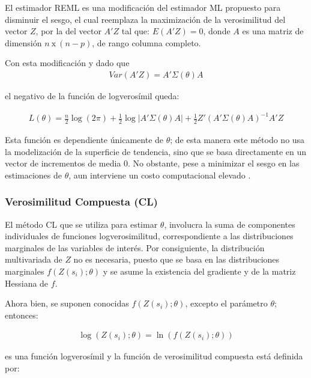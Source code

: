 \documentclass[
]{book}
\begin{document}
El estimador REML es una modificación del estimador ML propuesto para disminuir el sesgo, el cual reemplaza la maximización de la verosimilitud del vector \(Z\), por la del vector \(A'Z\) tal que: \(E(A'Z)=0\), donde \(A\) es una matriz de dimensión \(n\ \text{x}\ (n-p)\), de rango columna completo.

Con esta modificación y dado que \begin{align}
  Var(A'Z)=A'\Sigma(\theta)A  
\end{align}

el negativo de la función de logverosímil queda:

\begin{align}
   L(\theta)=\frac{n}{2}\log(2\pi)+\frac{1}{2} \log|A'\Sigma(\theta) A|+\frac{1}{2}Z'(A'\Sigma(\theta) A)^{-1} A'Z 
\end{align}

Esta función es dependiente únicamente de \(\theta\); de esta manera este método no usa la modelización de la superficie de tendencia, sino que se basa directamente en un vector de incrementos de media 0. No obstante, pese a minimizar el sesgo en las estimaciones de \(\theta\), aun interviene un costo computacional elevado \citep{marta}.

\hypertarget{verosimilitud-compuesta-cl}{%
\subsubsection*{Verosimilitud Compuesta (CL)}\label{verosimilitud-compuesta-cl}}

El método CL que se utiliza para estimar \(\theta\), involucra la suma de componentes individuales de funciones logverosimilitud, correspondiente a las distribuciones marginales de las variables de interés. Por consiguiente, la distribución multivariada de \(Z\) no es necesaria, puesto que se basa en las distribuciones marginales \(f(Z(s_i);\theta)\) y se asume la existencia del gradiente y de la matriz Hessiana de \(f\).

Ahora bien, se suponen conocidas \(f(Z(s_i);\theta)\), excepto el parámetro \(\theta\); entonces:

\begin{align}
  \log(Z(s_i);\theta)=\ln(f(Z(s_i);\theta))  
\end{align}

es una función logverosímil y la función de verosimilitud compuesta está definida por:
\end{document}
